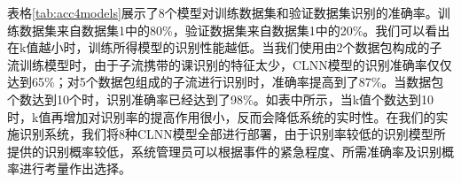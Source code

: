 表格\ref{tab:acc4models}展示了8个模型对训练数据集和验证数据集识别的准确率。训练数据集来自数据集1中的80\%，验证数据集来自数据集1中的20\%。我们可以看出在k值越小时，训练所得模型的识别性能越低。当我们使用由2个数据包构成的子流训练模型时，由于子流携带的课识别的特征太少，CLNN模型的识别准确率仅仅达到65\%；对5个数据包组成的子流进行识别时，准确率提高到了87\%。当数据包个数达到10个时，识别准确率已经达到了98\%。如表中所示，当k值个数达到10时，k值再增加对识别率的提高作用很小，反而会降低系统的实时性。在我们的实施识别系统，我们将8种CLNN模型全部进行部署，由于识别率较低的识别模型所提供的识别概率较低，系统管理员可以根据事件的紧急程度、所需准确率及识别概率进行考量作出选择。
